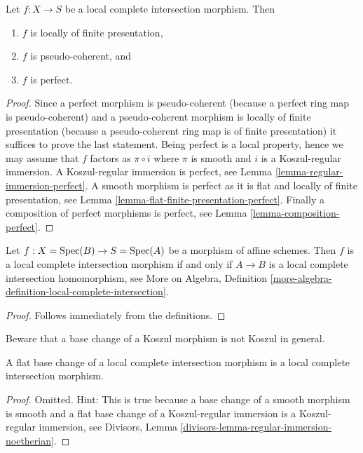 \begin{lemma}
\label{lemma-lci-properties}
Let $f : X \to S$ be a local complete intersection morphism.
Then
\begin{enumerate}
\item $f$ is locally of finite presentation,
\item $f$ is pseudo-coherent, and
\item $f$ is perfect.
\end{enumerate}
\end{lemma}

\begin{proof}
Since a perfect morphism is pseudo-coherent
(because a perfect ring map is pseudo-coherent)
and a pseudo-coherent morphism is locally of finite presentation
(because a pseudo-coherent ring map is of finite presentation)
it suffices to prove the last statement. Being perfect is a local
property, hence we may assume that $f$ factors as $\pi \circ i$ where
$\pi$ is smooth and $i$ is a Koszul-regular immersion.
A Koszul-regular immersion is perfect, see
Lemma \ref{lemma-regular-immersion-perfect}.
A smooth morphism is perfect as it is flat and locally of finite
presentation, see
Lemma \ref{lemma-flat-finite-presentation-perfect}.
Finally a composition of perfect morphisms is perfect, see
Lemma \ref{lemma-composition-perfect}.
\end{proof}

\begin{lemma}
\label{lemma-affine-lci}
Let $f : X = \mathop{\rm Spec}(B) \to S = \mathop{\rm Spec}(A)$ be a morphism of affine schemes.
Then $f$ is a local complete intersection morphism if and only if
$A \to B$ is a local complete intersection homomorphism, see
More on Algebra, Definition
\ref{more-algebra-definition-local-complete-intersection}.
\end{lemma}

\begin{proof}
Follows immediately from the definitions.
\end{proof}

\noindent
Beware that a base change of a Koszul morphism is not
Koszul in general.

\begin{lemma}
\label{lemma-flat-base-change-lci}
A flat base change of a local complete intersection morphism is a
local complete intersection morphism.
\end{lemma}

\begin{proof}
Omitted. Hint: This is true because a base change of a smooth morphism
is smooth and a flat base change of a Koszul-regular immersion is a
Koszul-regular immersion, see
Divisors, Lemma \ref{divisors-lemma-regular-immersion-noetherian}.
\end{proof}

